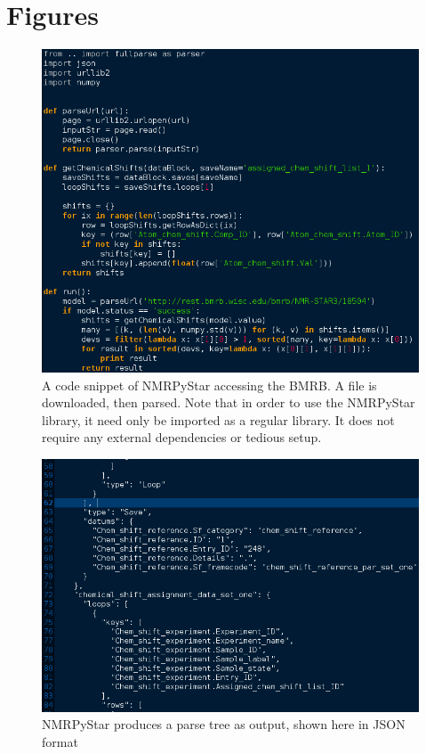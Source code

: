 \section{Figures}

\begin{figure}[h]
  \includegraphics[scale=0.5]{figures/nmrpystar_bmrb}
  \caption[A code snippet of NMRPyStar]
          {A code snippet of NMRPyStar accessing the BMRB.
           A file is downloaded, then parsed.  Note that in order to use
           the NMRPyStar library, it need only be imported as a regular
           library.  It does not require any external dependencies or
           tedious setup.}
  \label{nmrpystar_bmrb}
\end{figure}

\begin{figure}
  \includegraphics[scale=0.5]{figures/nmrpystar_json}
  \caption[NMRPyStar produces a parse tree as output]
          {NMRPyStar produces a parse tree as output, shown here in JSON format}
  \label{nmrpystar_json}
\end{figure}

